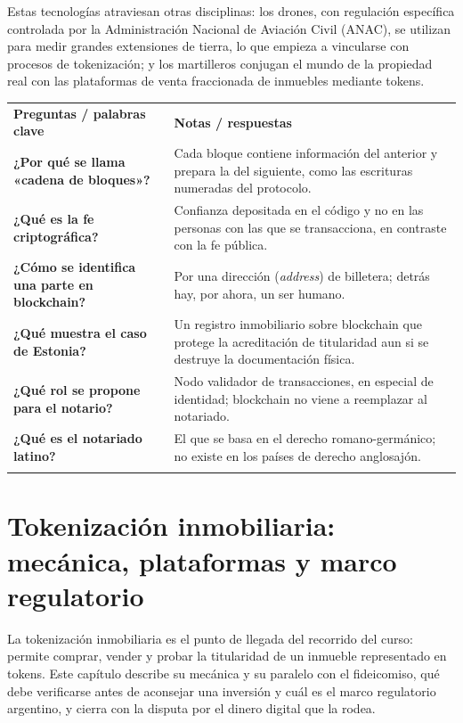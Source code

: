 \documentclass[12pt,oneside]{book}
\newcommand{\cq}[1]{\textbf{#1}}
\newcommand{\cornell}[3]{%
  \par\medskip\noindent\begingroup
  \renewcommand{\arraystretch}{1.25}%
  \begin{tabularx}{\textwidth}{|>{\raggedright\arraybackslash}p{0.27\textwidth}|>{\raggedright\arraybackslash}X|}
    \hline
    \multicolumn{2}{|>{\centering\arraybackslash}X|}{\cellcolor{azulacad!12}\textbf{Cuadro Cornell --- #1}}\\ \hline
    \cellcolor{gray!10}\textbf{Preguntas / palabras clave} & \cellcolor{gray!10}\textbf{Notas / respuestas} \\ \hline
    #2
    \multicolumn{2}{|>{\raggedright\arraybackslash}X|}{\cellcolor{azulacad!6}\textbf{Resumen.} #3}\\ \hline
  \end{tabularx}%
  \endgroup\par\medskip}
\begin{document}
Estas tecnologías atraviesan otras disciplinas: los drones, con regulación específica controlada por la Administración Nacional de Aviación Civil (ANAC), se utilizan para medir grandes extensiones de tierra, lo que empieza a vincularse con procesos de tokenización; y los martilleros conjugan el mundo de la propiedad real con las plataformas de venta fraccionada de inmuebles mediante tokens.

\cornell{Blockchain, notariado y registros}{
\cq{¿Por qué se llama «cadena de bloques»?} & Cada bloque contiene información del anterior y prepara la del siguiente, como las escrituras numeradas del protocolo. \\ \hline
\cq{¿Qué es la fe criptográfica?} & Confianza depositada en el código y no en las personas con las que se transacciona, en contraste con la fe pública. \\ \hline
\cq{¿Cómo se identifica una parte en blockchain?} & Por una dirección (\emph{address}) de billetera; detrás hay, por ahora, un ser humano. \\ \hline
\cq{¿Qué muestra el caso de Estonia?} & Un registro inmobiliario sobre blockchain que protege la acreditación de titularidad aun si se destruye la documentación física. \\ \hline
\cq{¿Qué rol se propone para el notario?} & Nodo validador de transacciones, en especial de identidad; blockchain no viene a reemplazar al notariado. \\ \hline
\cq{¿Qué es el notariado latino?} & El que se basa en el derecho romano-germánico; no existe en los países de derecho anglosajón. \\ \hline
}{Blockchain funciona como un protocolo notarial digital: bloques encadenados e irreversibles. Traslada la confianza del intermediario al código y abre el debate sobre registros y notariado, donde el notario aparece como nodo validador de identidad.}

\chapter{Tokenización inmobiliaria: mecánica, plataformas y marco regulatorio}
\label{cap:tokenizacion}

La tokenización inmobiliaria es el punto de llegada del recorrido del curso: permite comprar, vender y probar la titularidad de un inmueble representado en tokens. Este capítulo describe su mecánica y su paralelo con el fideicomiso, qué debe verificarse antes de aconsejar una inversión y cuál es el marco regulatorio argentino, y cierra con la disputa por el dinero digital que la rodea.
\end{document}
